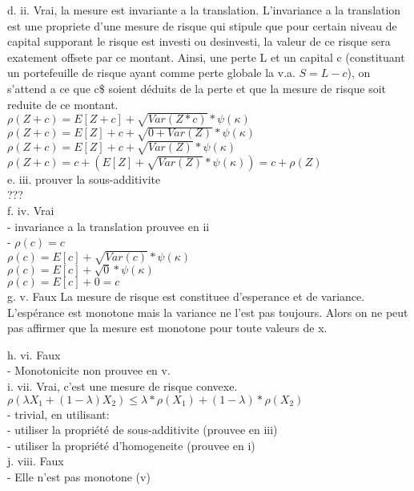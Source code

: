d. ii. Vrai, la mesure est invariante a la translation. L'invariance a la translation est une propriete d'une mesure de risque qui stipule que pour certain niveau de capital supporant le risque est investi ou desinvesti, la valeur de ce risque sera exatement offsete par ce montant. Ainsi, une perte L et un capital c (constituant un portefeuille de risque ayant comme perte globale la v.a. $S = L-c$), on s'attend a ce que c\$ soient déduits de la perte et que la mesure de risque soit reduite de ce montant. \\

$\rho(Z+c) = E[Z+c] + \sqrt{Var(Z*c)} * \psi(\kappa)$\\
$\rho(Z+c) = E[Z]+c + \sqrt{0+Var(Z)} * \psi(\kappa)$\\
$\rho(Z+c) = E[Z]+c + \sqrt{Var(Z)} * \psi(\kappa)$\\
$\rho(Z+c) = c + (E[Z] + \sqrt{Var(Z)} * \psi(\kappa)) = c + \rho(Z)$\\

e. iii. prouver la sous-additivite\\
???\\

f. iv. Vrai \\
- invariance a la translation prouvee en ii\\
- $\rho(c) = c$\\

$\rho(c) = E[c] + \sqrt{Var(c)} * \psi(\kappa)$\\
$\rho(c) = E[c] + \sqrt{0} * \psi(\kappa)$\\
$\rho(c) = E[c] + 0 = c$\\

g. v. Faux
La mesure de risque est constituee d'esperance et de variance. L'espérance est monotone mais la variance ne l'est pas toujours. Alors on ne peut pas affirmer que la mesure est monotone pour toute valeurs de x. 

h. vi. Faux\\
- Monotonicite non prouvee en v.\\

i. vii. Vrai, c'est une mesure de risque convexe. \\
$\rho(\lambda X_1 + (1-\lambda)X_2) \leq \lambda*\rho(X_1) + (1-\lambda)*\rho(X_2)$\\
- trivial, en utilisant:\\
- utiliser la propriété de sous-additivite (prouvee en iii)\\
- utiliser la propriété d'homogeneite (prouvee en i)\\

j. viii. Faux\\
- Elle n'est pas monotone (v)\\
